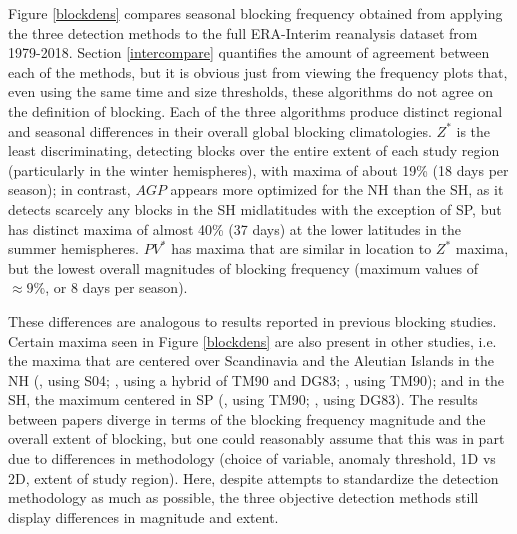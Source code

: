 \documentclass[smallextended]{svjour3}       %
\numberwithin{equation}{section}
\begin{document}
Figure \ref{blockdens} compares seasonal blocking frequency obtained from applying the three detection methods to the full ERA-Interim reanalysis dataset from 1979-2018. Section \ref{intercompare} quantifies the amount of agreement between each of the methods, but it is obvious just from viewing the frequency plots that, even using the same time and size thresholds, these algorithms do not agree on the definition of blocking. Each of the three algorithms produce distinct regional and seasonal differences in their overall global blocking climatologies. $Z^*$ is the least discriminating, detecting blocks over the entire extent of each study region (particularly in the winter hemispheres), with maxima of about 19\% (18 days per season); in contrast, $AGP$ appears more optimized for the NH than the SH, as it detects scarcely any blocks in the SH midlatitudes with the exception of SP, but has distinct maxima of almost 40\% (37 days) at the lower latitudes in the summer hemispheres.  $PV^*$ has maxima that are similar in location to $Z^*$ maxima, but the lowest overall magnitudes of blocking frequency (maximum values of $\approx 9\%$, or 8 days per season). 


These differences are analogous to results reported in previous blocking studies. Certain maxima seen in Figure \ref{blockdens} are also present in other studies, i.e. the maxima that are centered over Scandinavia and the Aleutian Islands in the NH (\citealt{croci-maspoli_multifaceted_2007}, using S04; \citealt{dunn-sigouin_evaluation_2012}, using a hybrid of TM90 and DG83; \citealt{cheung_revisiting_2013}, using TM90); and in the SH, the maximum centered in SP (\citealt{wiedenmann_climatology_2002}, using TM90; \citealt{parsons_assessment_2016}, using DG83). The results between papers diverge in terms of the blocking frequency magnitude and the overall extent of blocking, but one could reasonably assume that this was in part due to differences in methodology (choice of variable, anomaly threshold, 1D vs 2D, extent of study region). Here, despite attempts to standardize the detection methodology as much as possible, the three objective detection methods still display differences in magnitude and extent. 
\end{document}
